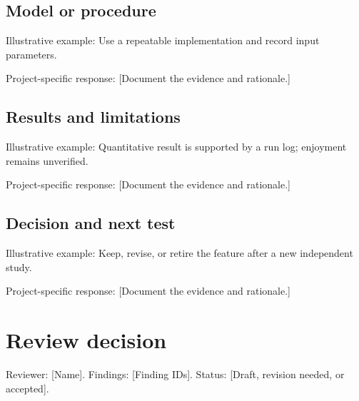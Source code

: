 \documentclass[11pt]{article}
\begin{document}
\subsection{Model or procedure}
Illustrative example: Use a repeatable implementation and record input parameters.

Project-specific response: [Document the evidence and rationale.]


\subsection{Results and limitations}
Illustrative example: Quantitative result is supported by a run log; enjoyment remains unverified.

Project-specific response: [Document the evidence and rationale.]


\subsection{Decision and next test}
Illustrative example: Keep, revise, or retire the feature after a new independent study.

Project-specific response: [Document the evidence and rationale.]


\section{Review decision}
Reviewer: [Name]. Findings: [Finding IDs]. Status: [Draft, revision needed, or accepted].
\end{document}
